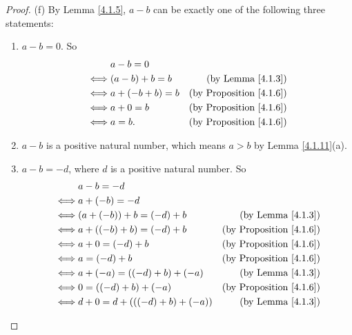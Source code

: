 \begin{proof}{(f)}
    By Lemma \ref{4.1.5}, \(a - b\) can be exactly one of the following three statements:
    \begin{enumerate}[label=(\roman*)]
        \item \(a - b = 0\).
              So
              \begin{align*}
                       & a - b = 0                                              \\
                  \iff & (a - b) + b = b  & \text{(by Lemma \ref{4.1.3})}       \\
                  \iff & a + (-b + b) = b & \text{(by Proposition \ref{4.1.6})} \\
                  \iff & a + 0 = b        & \text{(by Proposition \ref{4.1.6})} \\
                  \iff & a = b.           & \text{(by Proposition \ref{4.1.6})}
              \end{align*}
        \item \(a - b\) is a positive natural number, which means \(a > b\) by Lemma \ref{4.1.11}(a).
        \item \(a - b = -d\), where \(d\) is a positive natural number.
              So
              \begin{align*}
                       & a - b = -d                                                            \\
                  \iff & a + (-b) = -d                                                         \\
                  \iff & (a + (-b)) + b = (-d) + b       & \text{(by Lemma \ref{4.1.3})}       \\
                  \iff & a + ((-b) + b) = (-d) + b       & \text{(by Proposition \ref{4.1.6})} \\
                  \iff & a + 0 = (-d) + b                & \text{(by Proposition \ref{4.1.6})} \\
                  \iff & a = (-d) + b                    & \text{(by Proposition \ref{4.1.6})} \\
                  \iff & a + (-a) = ((-d) + b) + (-a)    & \text{(by Lemma \ref{4.1.3})}       \\
                  \iff & 0 = ((-d) + b) + (-a)           & \text{(by Proposition \ref{4.1.6})} \\
                  \iff & d + 0 = d + (((-d) + b) + (-a)) & \text{(by Lemma \ref{4.1.3})}       \\

\end{align*}
\end{enumerate}
\end{proof}
